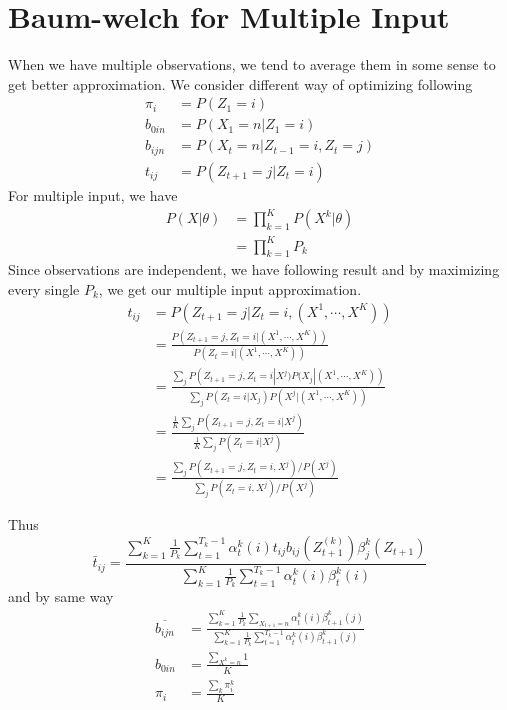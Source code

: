 \documentclass[10pt, oneside]{article}
\begin{document}
\section{Baum-welch for Multiple Input}
\label{appendix:d}

When we have multiple observations, we tend to average them in some sense to get better approximation. We consider different way of optimizing following
$$
\begin{aligned}
\pi_{i}&=P\left(Z_{1}=i\right)\\
b_{0i n}&=P\left(X_{1}=n | Z_{1}=i\right)\\
b_{i j n}&=P\left(X_{t}=n | Z_{t-1}=i, Z_{t}=j\right)\\
t_{i j}&=P\left(Z_{t+1}=j | Z_{t}=i\right)
\end{aligned}
$$
For multiple input, we have 
$$
\begin{aligned} P(X | \theta) &=\prod_{k=1}^{K} P\left(X^{k} | \theta \right) \\ &=\prod_{k=1}^{K} P_{k} \end{aligned}
$$
Since observations are independent, we have following result and by maximizing every single $P_k$, we get our multiple input approximation.
$$
\begin{aligned}
t_{i j}&=P\left(Z_{t+1}=j | Z_{t}=i, (X^1, \cdots, X^K)\right)\\
&=\frac{P\left(Z_{t+1}=j  , Z_{t}=i |(X^1, \cdots, X^K)\right)}{P(Z_t=i | (X^1, \cdots, X^K) )}\\
&=\frac{\sum_j P\left(Z_{t+1}=j  , Z_{t}=i | X^j)P(X_j| (X^1, \cdots, X^K)\right)}{\sum_j P(Z_t=i | X_j)P(X^j| (X^1, \cdots, X^K) )}\\
&=\frac{\frac{1}{K} \sum_j P(Z_{t+1}=j  , Z_{t}=i | X^j)}{\frac{1}{K} \sum_j P(Z_t=i | X^j)}\\
&=\frac{ \sum_j P(Z_{t+1}=j  , Z_{t}=i ,X^j) /P(X^j)}{ \sum_j P(Z_t=i ,X^j) /P(X^j)}
\end{aligned}
$$

Thus 
$$
\bar{t}_{i j}=\frac{\sum_{k=1}^{K} \frac{1}{P_{k}} \sum_{t=1}^{T_{k}-1} \alpha_{t}^{k}(i) t_{i j} b_{ij}\left(Z_{t+1}^{(k)}\right) \beta_{j}^{k}(Z_{t+1})}{\sum_{k=1}^{K} \frac{1}{P_{k}} \sum_{t=1}^{T_{k}-1} \alpha_{t}^{k}(i) \beta_{t}^{k}(i)}
$$
and by same way
$$
\begin{aligned}
\overline{b_{ijn}}&=\frac{\sum_{k=1}^{K} \frac{1}{P_{k}} \sum_{X_{t+1}=n}\alpha_{t}^{k}(i) \beta_{t+1}^{k}(j)}{\sum_{k=1}^{K} \frac{1}{P_{k}} \sum_{t=1}^{T_{k}-1} \alpha_{t}^{k}(i) \beta_{t+1}^{k}(j)}\\
b_{0in}&=\frac{\sum_{X^k=n} 1}{K}\\
\pi_i&=\frac{\sum_k \pi^k_i}{K}
\end{aligned}
$$
\end{document}
